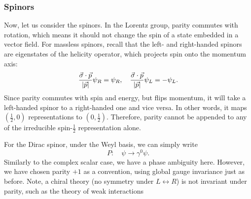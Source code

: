 \documentclass[11pt]{article}
\theoremstyle{definition}
\begin{document}
\subsubsection{Spinors}
Now, let us consider the spinors. In the Lorentz group, parity commutes with rotation, which means it should not change the spin of a state embedded in a vector field. For massless spinors, recall that the left- and right-handed spinors are eigenstates of the helicity operator, which projects spin onto the momentum axis:
\begin{equation}
    \frac{\vec{\sigma}\cdot\vec{p}}{\abs{\vec{p}}}\psi_R = \psi_R, \quad  \frac{\vec{\sigma}\cdot\vec{p}}{\abs{\vec{p}}}\psi_L = -\psi_L.
\end{equation}
Since parity commutes with spin and energy, but flips momentum, it will take a left-handed spinor to a right-handed one and vice versa. In other words, it maps $(\frac{1}{2},0)$ representations to $(0,\frac{1}{2})$. Therefore, parity cannot be appended to any of the irreducible spin-$\frac{1}{2}$ representation alone.

For the Dirac spinor, under the Weyl basis, we can simply write
\begin{equation}
    P: \quad \psi \to \gamma^0 \psi.
\end{equation}
Similarly to the complex scalar case, we have a phase ambiguity here. However, we have chosen parity $+1$ as a convention, using global gauge invariance just as before. Note, a chiral theory (no symmetry under $L \leftrightarrow R$) is not invariant under parity, such as the theory of weak interactions
\end{document}
